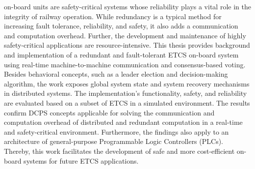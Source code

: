 
\null\vfil
\begin{center}\textsf{\textbf{\abstractname}}\end{center}
%
\noindent {} on-board units are safety-critical systems whose reliability plays a vital role in the integrity of railway operation.
While redundancy is a typical method for increasing fault tolerance, reliability, and safety, it also adds a communication and computation overhead.
Further, the development and maintenance of highly safety-critical applications are resource-intensive.
This thesis provides background and implementation of a redundant and fault-tolerant ETCS on-board system using real-time  machine-to-machine communication and consensus-based voting.
Besides behavioral concepts, such as a leader election and decision-making algorithm, the work exposes global system state and system recovery mechanisms in distributed systems.
The implementation's functionality, safety, and reliability are evaluated based on a subset of ETCS in a simulated environment.
The results confirm DCPS concepts applicable for solving the communication and computation overhead of distributed and redundant computation in a real-time and safety-critical environment.
Furthermore, the findings also apply to an architecture of general-purpose Programmable Logic Controllers (PLCs).
Thereby, this work facilitates the development of safe and more cost-efficient on-board systems for future ETCS applications.

\vfil\null


